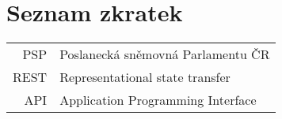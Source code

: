 \documentclass[czech,bachelor,unicode]{ctufit-thesis}
\theoremstyle{plain}
\theoremstyle{definition}
\theoremstyle{remark}
\numberwithin{theorem}{chapter}
\begin{document}

\chapter{Seznam zkratek}
	
\begin{tabular}{rl}
PSP & Poslanecká sněmovná Parlamentu ČR\\
REST & Representational state transfer\\
API & Application Programming Interface
\end{tabular}

\mainmatter\mainmatterinit %



\appendix\appendixinit %


\backmatter %

\printbibliography %

\end{document}
